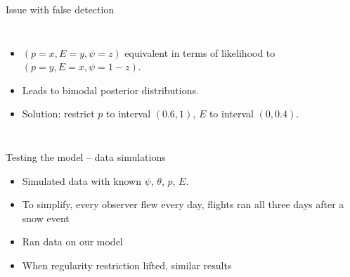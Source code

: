 \documentclass{beamer}
\begin{document}
\begin{frame}{Issue with false detection}
	\begin{columns}
		\column{5cm}
		\begin{itemize}
			\item $(p=x, E=y, \psi=z)$ equivalent in terms of likelihood to
			$(p=y,E=x,\psi=1-z)$.
			\item Leads to bimodal posterior distributions.
			\item Solution: restrict $p$ to interval $(0.6,1)$, $E$ to interval
			$(0,0.4)$.
		\end{itemize}
		\column{5cm}
	\end{columns}
\end{frame}


\begin{frame}{Testing the model -- data simulations}
	\begin{itemize}
		\item Simulated data with known $\psi$, $\theta$, $p$, $E$.
		\item To simplify, every observer flew every day, flights ran all
		three days after a snow event
		\item Ran data on our model
		\item When regularity restriction lifted, similar results
	\end{itemize}
\end{frame}
\end{document}
